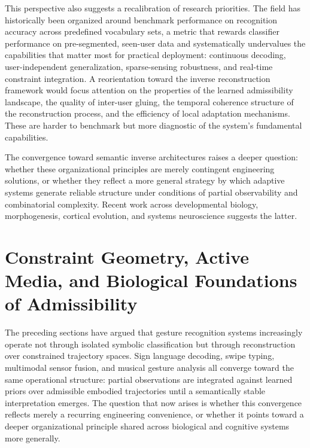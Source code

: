 \documentclass[11pt, a4paper]{article}
\theoremstyle{definition}
\begin{document}
This perspective also suggests a recalibration of research priorities. The field has historically been organized around benchmark performance on recognition accuracy across predefined vocabulary sets, a metric that rewards classifier performance on pre-segmented, seen-user data and systematically undervalues the capabilities that matter most for practical deployment: continuous decoding, user-independent generalization, sparse-sensing robustness, and real-time constraint integration. A reorientation toward the inverse reconstruction framework would focus attention on the properties of the learned admissibility landscape, the quality of inter-user gluing, the temporal coherence structure of the reconstruction process, and the efficiency of local adaptation mechanisms. These are harder to benchmark but more diagnostic of the system's fundamental capabilities.


The convergence toward semantic inverse architectures raises a deeper question: whether these organizational principles are merely contingent engineering solutions, or whether they reflect a more general strategy by which adaptive systems generate reliable structure under conditions of partial observability and combinatorial complexity. Recent work across developmental biology, morphogenesis, cortical evolution, and systems neuroscience suggests the latter.

\section{Constraint Geometry, Active Media, and Biological Foundations of Admissibility}

The preceding sections have argued that gesture recognition systems increasingly operate not through isolated symbolic classification but through reconstruction over constrained trajectory spaces. Sign language decoding, swipe typing, multimodal sensor fusion, and musical gesture analysis all converge toward the same operational structure: partial observations are integrated against learned priors over admissible embodied trajectories until a semantically stable interpretation emerges. The question that now arises is whether this convergence reflects merely a recurring engineering convenience, or whether it points toward a deeper organizational principle shared across biological and cognitive systems more generally.
\end{document}
